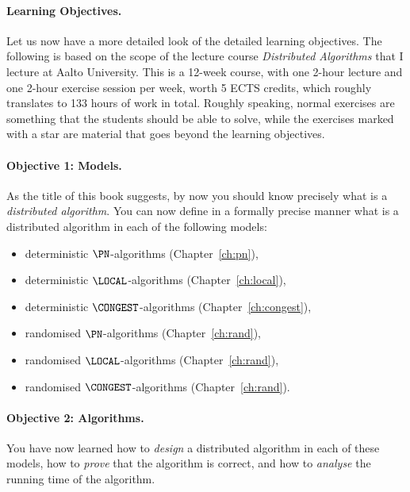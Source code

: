 \paragraph{Learning Objectives.}

Let us now have a more detailed look of the detailed learning objectives. The following is based on the scope of the lecture course \emph{Distributed Algorithms} that I lecture at Aalto University. This is a 12-week course, with one 2-hour lecture and one 2-hour exercise session per week, worth 5 ECTS credits, which roughly translates to 133 hours of work in total. Roughly speaking, normal exercises are something that the students should be able to solve, while the exercises marked with a star are material that goes beyond the learning objectives.


\paragraph{Objective 1: Models.}

As the title of this book suggests, by now you should know precisely what is a \emph{distributed algorithm}. You can now define in a formally precise manner what is a distributed algorithm in each of the following models:
\begin{itemize}[noitemsep]
    \item deterministic $\PN$-algorithms (Chapter~\ref{ch:pn}),
    \item deterministic $\LOCAL$-algorithms (Chapter~\ref{ch:local}),
    \item deterministic $\CONGEST$-algorithms (Chapter~\ref{ch:congest}),
    \item randomised $\PN$-algorithms (Chapter~\ref{ch:rand}),
    \item randomised $\LOCAL$-algorithms (Chapter~\ref{ch:rand}),
    \item randomised $\CONGEST$-algorithms (Chapter~\ref{ch:rand}).
\end{itemize}


\paragraph{Objective 2: Algorithms.}

You have now learned how to \emph{design} a distributed algorithm in each of these models, how to \emph{prove} that the algorithm is correct, and how to \emph{analyse} the running time of the algorithm.

